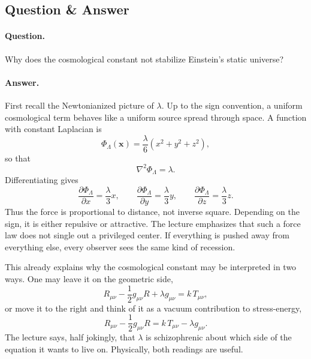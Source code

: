 \subsection{Question \& Answer}

\paragraph{Question.} Why does the cosmological constant not stabilize Einstein's static universe?

\paragraph{Answer.} First recall the Newtonianized picture of \(\lambda\). Up to the sign convention, a uniform cosmological term behaves like a uniform source spread through space. A function with constant Laplacian is
\begin{equation}
\Phi_\Lambda(\mathbf{x})
=
\frac{\lambda}{6}\left(x^2+y^2+z^2\right),
\end{equation}
so that
\begin{equation}
\nabla^2\Phi_\Lambda=\lambda.
\end{equation}
Differentiating gives
\begin{equation}
\frac{\partial \Phi_\Lambda}{\partial x}=\frac{\lambda}{3}x,
\qquad
\frac{\partial \Phi_\Lambda}{\partial y}=\frac{\lambda}{3}y,
\qquad
\frac{\partial \Phi_\Lambda}{\partial z}=\frac{\lambda}{3}z.
\end{equation}
Thus the force is proportional to distance, not inverse square. Depending on the sign, it is either repulsive or attractive. The lecture emphasizes that such a force law does not single out a privileged center. If everything is pushed away from everything else, every observer sees the same kind of recession.

This already explains why the cosmological constant may be interpreted in two ways. One may leave it on the geometric side,
\begin{equation}
R_{\mu\nu}-\frac12 g_{\mu\nu}R+\lambda g_{\mu\nu}=k\,T_{\mu\nu},
\end{equation}
or move it to the right and think of it as a vacuum contribution to stress-energy,
\begin{equation}
R_{\mu\nu}-\frac12 g_{\mu\nu}R
=
k\,T_{\mu\nu}-\lambda g_{\mu\nu}.
\end{equation}
The lecture says, half jokingly, that \(\lambda\) is schizophrenic about which side of the equation it wants to live on. Physically, both readings are useful.

